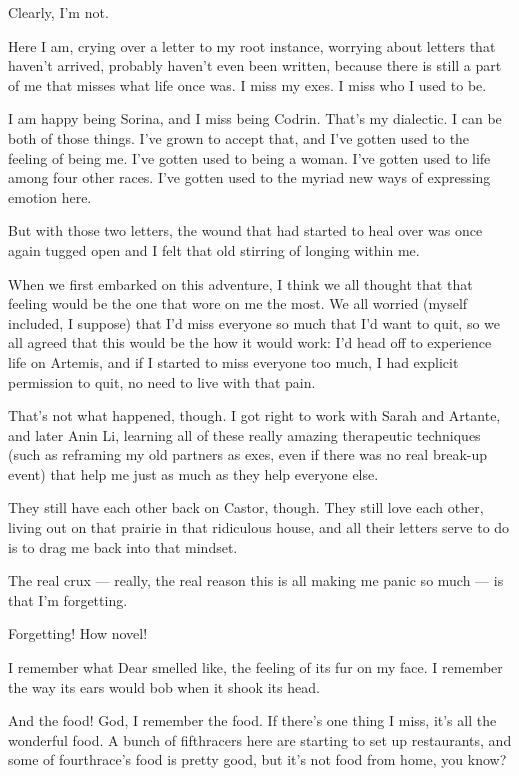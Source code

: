 Clearly, I'm not.

Here I am, crying over a letter to my root instance, worrying about letters that haven't arrived, probably haven't even been written, because there is still a part of me that misses what life once was. I miss my exes. I miss who I used to be.

I am happy being Sorina, and I miss being Codrin. That's my dialectic. I can be both of those things. I've grown to accept that, and I've gotten used to the feeling of being me. I've gotten used to being a woman. I've gotten used to life among four other races. I've gotten used to the myriad new ways of expressing emotion here.

But with those two letters, the wound that had started to heal over was once again tugged open and I felt that old stirring of longing within me.

When we first embarked on this adventure, I think we all thought that that feeling would be the one that wore on me the most. We all worried (myself included, I suppose) that I'd miss everyone so much that I'd want to quit, so we all agreed that this would be the how it would work: I'd head off to experience life on Artemis, and if I started to miss everyone too much, I had explicit permission to quit, no need to live with that pain.

That's not what happened, though. I got right to work with Sarah and Artante, and later Anin Li, learning all of these really amazing therapeutic techniques (such as reframing my old partners as exes, even if there was no real break-up event) that help me just as much as they help everyone else.

They still have each other back on Castor, though. They still love each other, living out on that prairie in that ridiculous house, and all their letters serve to do is to drag me back into that mindset.

The real crux — really, the real reason this is all making me panic so much — is that I'm forgetting.

Forgetting! How novel!

I remember what Dear smelled like, the feeling of its fur on my face. I remember the way its ears would bob when it shook its head.

And the food! God, I remember the food. If there's one thing I miss, it's all the wonderful food. A bunch of fifthracers here are starting to set up restaurants, and some of fourthrace's food is pretty good, but it's not food from home, you know?

